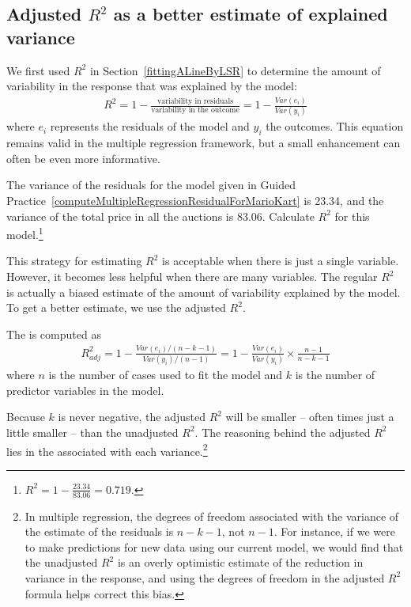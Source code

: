 \subsection{Adjusted $R^2$ as a better estimate of explained variance}


We first used $R^2$ in Section~\ref{fittingALineByLSR} to determine the amount of variability in the response that was explained by the model:
\begin{align*}
R^2 = 1 - \frac{\text{variability in residuals}}{\text{variability in the outcome}}
	= 1 - \frac{Var(e_i)}{Var(y_i)}
\end{align*}
where $e_i$ represents the residuals of the model and $y_i$ the outcomes. This equation remains valid in the multiple regression framework, but a small enhancement can often be even more informative.

\begin{exercise} \label{computeUnadjustedR2ForAllPredictorsInMarioKart}
The variance of the residuals for the model given in Guided Practice~\ref{computeMultipleRegressionResidualForMarioKart} is 23.34, and the variance of the total price in all the auctions is 83.06. Calculate $R^2$ for this model.\footnote{$R^2 = 1 - \frac{23.34}{83.06} = 0.719$.}
\end{exercise}

This strategy for estimating $R^2$ is acceptable when there is just a single variable. However, it becomes less helpful when there are many variables. The regular $R^2$ is actually a biased estimate of the amount of variability explained by the model. To get a better estimate, we use the adjusted $R^2$.

\begin{termBox}{
The  is computed as
\begin{align*}
R_{adj}^{2} = 1-\frac{Var(e_i) / (n-k-1)}{Var(y_i) / (n-1)}
	= 1-\frac{Var(e_i)}{Var(y_i)} \times \frac{n-1}{n-k-1}
\end{align*}
where $n$ is the number of cases used to fit the model and $k$ is the number of predictor variables in the model.}
\end{termBox}

Because $k$ is never negative, the adjusted $R^2$ will be smaller -- often times just a little smaller -- than the unadjusted $R^2$. The reasoning behind the adjusted $R^2$ lies in the  associated with each variance.\footnote{In multiple regression, the degrees of freedom associated with the variance of the estimate of the residuals is $n-k-1$, not $n-1$. For instance, if we were to make predictions for new data using our current model, we would find that the unadjusted $R^2$ is an overly optimistic estimate of the reduction in variance in the response, and using the degrees of freedom in the adjusted $R^2$ formula helps correct this bias.}

